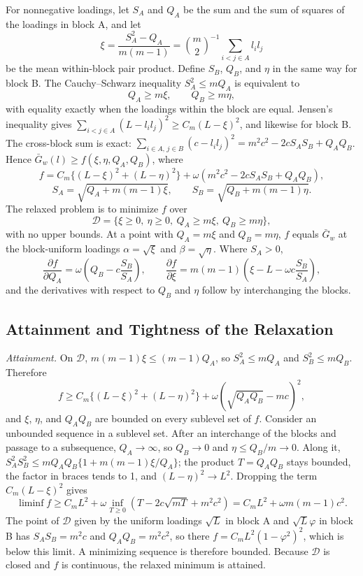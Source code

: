For nonnegative loadings, let $S_A$ and $Q_A$ be the sum and the sum of squares of the loadings in block A, and let
\[
\xi=\frac{S_A^2-Q_A}{m(m-1)}=\binom{m}{2}^{-1}\sum_{i<j\in A}l_il_j
\]
be the mean within-block pair product. Define $S_B$, $Q_B$, and $\eta$ in the same way for block B. The Cauchy--Schwarz inequality $S_A^2\le mQ_A$ is equivalent to
\[
Q_A\ge m\xi,\qquad Q_B\ge m\eta,
\]
with equality exactly when the loadings within the block are equal. Jensen's inequality gives $\sum_{i<j\in A}(L-l_il_j)^2\ge C_m(L-\xi)^2$, and likewise for block B. The cross-block sum is exact: $\sum_{i\in A,\,j\in B}(c-l_il_j)^2=m^2c^2-2cS_AS_B+Q_AQ_B$. Hence $\bar G_w(l)\ge f(\xi,\eta,Q_A,Q_B)$, where
\[
f=C_m\{(L-\xi)^2+(L-\eta)^2\}
+\omega\left(m^2c^2-2cS_AS_B+Q_AQ_B\right),
\]
\[
S_A=\sqrt{Q_A+m(m-1)\xi},\qquad S_B=\sqrt{Q_B+m(m-1)\eta}.
\]
The relaxed problem is to minimize $f$ over
\[
\mathcal D=\{\xi\ge0,\ \eta\ge0,\ Q_A\ge m\xi,\ Q_B\ge m\eta\},
\]
with no upper bounds. At a point with $Q_A=m\xi$ and $Q_B=m\eta$, $f$ equals $\bar G_w$ at the block-uniform loadings $\alpha=\sqrt\xi$ and $\beta=\sqrt\eta$. Where $S_A>0$,
\[
\frac{\partial f}{\partial Q_A}=\omega\left(Q_B-c\frac{S_B}{S_A}\right),
\qquad
\frac{\partial f}{\partial\xi}=m(m-1)\left(\xi-L-\omega c\frac{S_B}{S_A}\right),
\]
and the derivatives with respect to $Q_B$ and $\eta$ follow by interchanging the blocks.

\subsection{Attainment and Tightness of the Relaxation}
\label{app:uls-tight}

\emph{Attainment.} On $\mathcal D$, $m(m-1)\xi\le(m-1)Q_A$, so $S_A^2\le mQ_A$ and $S_B^2\le mQ_B$. Therefore
\[
f\ge C_m\{(L-\xi)^2+(L-\eta)^2\}+\omega\left(\sqrt{Q_AQ_B}-mc\right)^2,
\]
and $\xi$, $\eta$, and $Q_AQ_B$ are bounded on every sublevel set of $f$. Consider an unbounded sequence in a sublevel set. After an interchange of the blocks and passage to a subsequence, $Q_A\to\infty$, so $Q_B\to0$ and $\eta\le Q_B/m\to0$. Along it, $S_A^2S_B^2\le mQ_AQ_B\{1+m(m-1)\xi/Q_A\}$; the product $T=Q_AQ_B$ stays bounded, the factor in braces tends to 1, and $(L-\eta)^2\to L^2$. Dropping the term $C_m(L-\xi)^2$ gives
\[
\liminf f\ge C_mL^2+\omega\inf_{T\ge0}\left(T-2c\sqrt{mT}+m^2c^2\right)
=C_mL^2+\omega m(m-1)c^2 .
\]
The point of $\mathcal D$ given by the uniform loadings $\sqrt L$ in block A and $\sqrt L\varphi$ in block B has $S_AS_B=m^2c$ and $Q_AQ_B=m^2c^2$, so there $f=C_mL^2(1-\varphi^2)^2$, which is below this limit. A minimizing sequence is therefore bounded. Because $\mathcal D$ is closed and $f$ is continuous, the relaxed minimum is attained.

